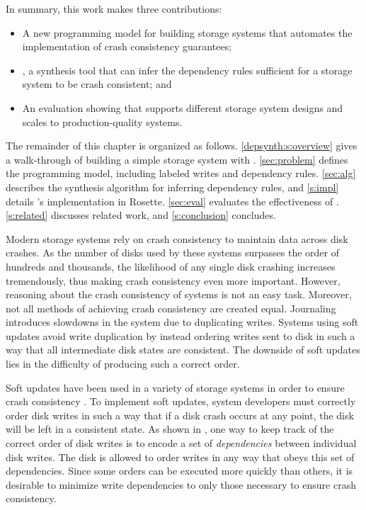 In summary, this work makes three contributions:
\begin{itemize}
\item A new programming model for building storage systems that automates the implementation of crash consistency guarantees;
\item \depsynth, a synthesis tool that can infer the dependency rules sufficient for a storage system to be crash consistent; and
\item An evaluation showing that \depsynth supports different storage system designs and scales to production-quality systems.
\end{itemize}

\noindent
The remainder of this chapter is organized as follows.
\cref{depsynth:s:overview} gives a walk-through of building a simple storage system with \depsynth.
\cref{sec:problem} defines the \depsynth programming model, including labeled writes and dependency rules.
\cref{sec:alg} describes the \depsynth synthesis algorithm for inferring dependency rules,
and \cref{s:impl} details \depsynth's implementation in Rosette.
\cref{sec:eval} evaluates the effectiveness of \depsynth.
\cref{s:related} discusses related work, and \cref{s:conclusion} concludes.\tighten

Modern storage systems rely on crash consistency to maintain data across disk crashes.
As the number of disks used by these systems surpasses the order of hundreds and thousands,
the likelihood of any single disk crashing increases tremendously, thus making crash
consistency even more important. However, reasoning about the crash consistency of systems
is not an easy task. Moreover, not all methods of achieving crash consistency are created equal.
Journaling introduces slowdowns in the system due to duplicating writes.
Systems using soft updates avoid write duplication by instead
ordering writes sent to disk in such a way that all intermediate disk states are consistent.
The downside of soft updates lies in the difficulty of producing such a correct order.

Soft updates have been used in a variety of storage systems in
order to ensure crash consistency . To implement soft updates, system
developers must correctly order disk writes in such a way that if a disk crash occurs
at any point, the disk will be left in a consistent state. As shown in ,
one way to keep track of the correct order of disk writes is to encode a set of \textit{dependencies}
between individual disk writes. The disk is allowed to order writes in any way that
obeys this set of dependencies.
Since some orders can be executed more quickly than others, it is desirable to minimize
write dependencies to only those necessary to ensure crash consistency.

